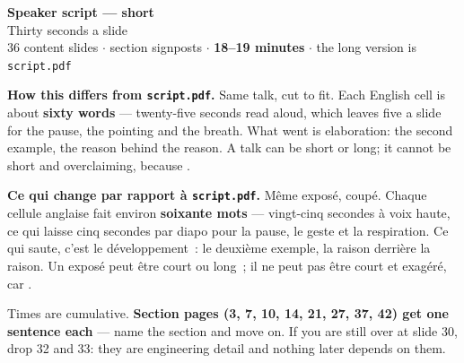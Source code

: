 \documentclass[10pt,a4paper]{article}
\begin{document}

\begin{center}
  {\LARGE\bfseries\color{accent} Speaker script --- short}\\[1.5mm]
  {\large Thirty seconds a slide}\\[3mm]
  {\color{muted}36 content slides \; $\cdot$  section signposts \; $\cdot$ \;
   \textbf{18--19 minutes} \; $\cdot$ \; the long version is \texttt{script.pdf}}
\end{center}

\vspace{4mm}
\noindent
\colorbox{wash}{\parbox{\dimexpr\textwidth-2\fboxsep}{\vspace{1.5mm}
\textbf{How this differs from \texttt{script.pdf}.} Same talk, cut to fit. Each
English cell is about \textbf{sixty words} --- twenty-five seconds read aloud,
which leaves five a slide for the pause, the pointing and the breath.  What went is elaboration: the
second example, the reason behind the reason. A talk can be short or long; it
cannot be short and overclaiming, because .

\medskip
{}
\textbf{Ce qui change par rapport à \texttt{script.pdf}.} Même exposé, coupé.
Chaque cellule anglaise fait environ \textbf{soixante mots} --- vingt-cinq
secondes à voix haute, ce qui laisse cinq secondes par diapo pour la pause, le
geste et la respiration.  Ce qui saute, c'est le développement~: le deuxième exemple, la raison
derrière la raison. Un exposé peut être court ou long~; il ne peut pas être court
et exagéré, car .
\vspace{1.5mm}}}

\vspace{3mm}
\noindent
{\footnotesize\color{muted}Times are cumulative. \textbf{Section pages (3, 7, 10,
14, 21, 27, 37, 42) get one sentence each} --- name the section and move on. If
you are still over at slide 30, drop 32 and 33: they are engineering detail and
nothing later depends on them.}

\clearpage
\end{document}
